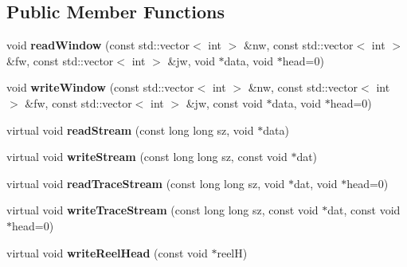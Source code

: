 \subsection*{Public Member Functions}
\begin{DoxyCompactItemize}
\item 
\mbox{\label{class_s_e_p_1_1basic_i_o_a6f49c9d5d614d74109b70de622150e84}} 
void {\bfseries read\+Window} (const std\+::vector$<$ int $>$ \&nw, const std\+::vector$<$ int $>$ \&fw, const std\+::vector$<$ int $>$ \&jw, void $\ast$data, void $\ast$head=0)
\item 
\mbox{\label{class_s_e_p_1_1basic_i_o_a2ceab7fbfd4aaccb9e30c4fdc44dcdbb}} 
void {\bfseries write\+Window} (const std\+::vector$<$ int $>$ \&nw, const std\+::vector$<$ int $>$ \&fw, const std\+::vector$<$ int $>$ \&jw, const void $\ast$data, void $\ast$head=0)
\item 
\mbox{\label{class_s_e_p_1_1basic_i_o_aa45d451a8e3df195ef5544af2d6c784e}} 
virtual void {\bfseries read\+Stream} (const long long sz, void $\ast$data)
\item 
\mbox{\label{class_s_e_p_1_1basic_i_o_a30130c1789ba50bd09c4a5594eb58b47}} 
virtual void {\bfseries write\+Stream} (const long long sz, const void $\ast$dat)
\item 
\mbox{\label{class_s_e_p_1_1basic_i_o_a7b6ff6b9962859d2bc36a3cabbb4712b}} 
virtual void {\bfseries read\+Trace\+Stream} (const long long sz, void $\ast$dat, void $\ast$head=0)
\item 
\mbox{\label{class_s_e_p_1_1basic_i_o_a4396e2220e693bc3236ab2078ecdf3b4}} 
virtual void {\bfseries write\+Trace\+Stream} (const long long sz, const void $\ast$dat, const void $\ast$head=0)
\item 
\mbox{\label{class_s_e_p_1_1basic_i_o_abbb1d5d9905cb8999f4e3e2b3f83cf8c}} 
virtual void {\bfseries write\+Reel\+Head} (const void $\ast$reelH)
\item 
\mbox{\label{class_s_e_p_1_1basic_i_o_aa911d3e6ec940a72169f7a7d5ecb1e9c}} 

\end{DoxyCompactItemize}
